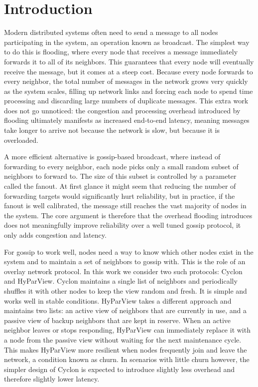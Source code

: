 \documentclass[sigconf,a4paper]{acmart}
\begin{document}
\maketitle

\section{Introduction}

Modern distributed systems often need to send a message to all nodes
participating in the system, an operation known as broadcast. The simplest
way to do this is flooding, where every node that receives a message
immediately forwards it to all of its neighbors. This guarantees that every
node will eventually receive the message, but it comes at a steep cost.
Because every node forwards to every neighbor, the total number of messages
in the network grows very quickly as the system scales, filling up network
links and forcing each node to spend time processing and discarding large
numbers of duplicate messages. This extra work does not go unnoticed: the
congestion and processing overhead introduced by flooding ultimately manifests
as increased end-to-end latency, meaning messages take longer to arrive not
because the network is slow, but because it is overloaded.

A more efficient alternative is gossip-based broadcast, where instead of
forwarding to every neighbor, each node picks only a small random subset of
neighbors to forward to. The size of this subset is controlled by a parameter
called the fanout. At first glance it might seem that reducing the number of
forwarding targets would significantly hurt reliability, but in practice,
if the fanout is well calibrated, the message still reaches the vast majority
of nodes in the system. The core argument is therefore that the overhead
flooding introduces does not meaningfully improve reliability over a well
tuned gossip protocol, it only adds congestion and latency.

For gossip to work well, nodes need a way to know which other nodes exist in
the system and to maintain a set of neighbors to gossip with. This is the
role of an overlay network protocol. In this work we consider two such
protocols: Cyclon and HyParView. Cyclon maintains a single list of neighbors
and periodically shuffles it with other nodes to keep the view random and
fresh. It is simple and works well in stable conditions. HyParView takes a
different approach and maintains two lists: an active view of neighbors that
are currently in use, and a passive view of backup neighbors that are kept
in reserve. When an active neighbor leaves or stops responding, HyParView
can immediately replace it with a node from the passive view without waiting
for the next maintenance cycle. This makes HyParView more resilient when
nodes frequently join and leave the network, a condition known as churn.
In scenarios with little churn however, the simpler design of Cyclon is
expected to introduce slightly less overhead and therefore slightly lower
latency.
\end{document}
